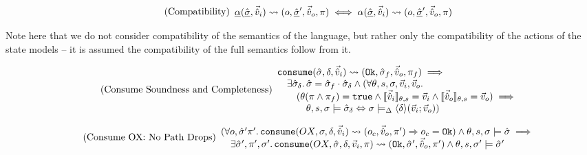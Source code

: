\begin{equation}
\tag{Compatibility}\label{eq:compatibility}
\begin{array}{l}
\underline{\alpha}(\underline{\hat{\sigma}}, \vec{\hat{v}}_i)\rightsquigarrow(o,\underline{\hat{\sigma}}',\vec{\hat{v}}_o,\pi) \iff
\alpha(\underline{\hat{\sigma}}, \vec{\hat{v}}_i)\rightsquigarrow(o,\underline{\hat{\sigma}}',\vec{\hat{v}}_o,\pi)
\end{array}
\end{equation}

Note here that we do not consider compatibility of the semantics of the language, but rather only the compatibility of the actions of the state models -- it is assumed the compatibility of the full semantics follow from it.


\begin{equation}
\tag{Consume Soundness and Completeness}\label{eq:consume-sound-complete}
\begin{array}{l}
\texttt{consume}(\hat{\sigma},\delta,\vec{\hat{v}}_i)\rightsquigarrow (\texttt{Ok},\hat{\sigma}_f,\vec{\hat{v}}_o,\pi_f) \implies\\
\quad\exists \hat{\sigma}_\delta\ldotp \hat{\sigma}=\hat{\sigma}_f\cdot\hat{\sigma}_\delta\land (\forall\theta,s,\sigma,\vec{v}_i,\vec{v}_o\ldotp \\
\qquad (\theta(\pi\land\pi_f)=\texttt{true} \land \llbracket\vec{\hat{v}}_i\rrbracket_{\theta,s} = \vec{v}_i \land \llbracket\vec{\hat{v}}_o\rrbracket_{\theta,s}=\vec{v}_o) \implies\\
\quad\qquad \theta,s,\sigma\models \hat{\sigma}_\delta \Leftrightarrow \sigma \models_\Delta \left<\delta\right>\!(\vec{v}_i;\vec{v}_o))
\end{array}
\end{equation}

\begin{equation}
\tag{Consume OX: No Path Drops}\label{eq:consume-ox-no-drop}
\begin{array}{l}
(\forall o, \hat{\sigma}'\pi'\ldotp \texttt{consume}(OX,\sigma,\delta,\vec{\hat{v}}_i)\rightsquigarrow (o_c, \vec{\hat{v}}_o, \pi')\Rightarrow o_c = \texttt{Ok})\land \theta, s, \sigma \models \hat{\sigma} \implies \\
\quad \exists  \hat{\sigma}', \pi', \sigma'\ldotp \texttt{consume}(OX, \hat{\sigma}, \delta,\vec{v}_i,\pi)\rightsquigarrow (\texttt{Ok}, \hat{\sigma}', \vec{\hat{v}}_o, \pi') \land \theta,s,\sigma' \models \hat{\sigma}'
\end{array}
\end{equation}

